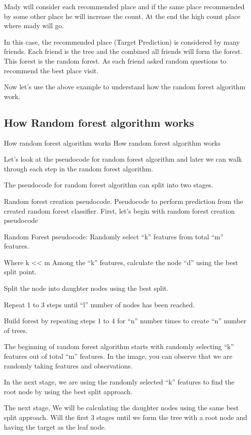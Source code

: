 \documentclass[a4paper,12pt]{article}
\begin{document}
Mady will consider each recommended place and if the same place recommended by some other place he will increase the count. At the end the high count place where mady will go.

In this case, the recommended place (Target Prediction) is considered by many friends. Each friend is the tree and the combined all friends will form the forest. This forest is the random forest. As each friend asked random questions to recommend the best place visit.

Now let’s use the above example to understand how the random forest algorithm work.

\subsection*{How Random forest algorithm works}
How random forest algorithm works
How random forest algorithm works

Let’s look at the pseudocode for random forest algorithm and later we can walk through each step in the random forest algorithm.

The pseudocode for random forest algorithm can split into two stages.

Random forest creation pseudocode.
Pseudocode to perform prediction from the created random forest classifier.
First, let’s begin with random forest creation pseudocode

Random Forest pseudocode:
Randomly select “k” features from total “m” features.

Where k << m
Among the “k” features, calculate the node “d” using the best split point.

Split the node into daughter nodes using the best split.

Repeat 1 to 3 steps until “l” number of nodes has been reached.

Build forest by repeating steps 1 to 4 for “n” number times to create “n” number of trees.

The beginning of random forest algorithm starts with randomly selecting “k” features out of total “m” features. In the image, you can observe that we are randomly taking features and observations.

In the next stage, we are using the randomly selected “k” features to find the root node by using the best split approach.

The next stage, We will be calculating the daughter nodes using the same best split approach. Will the first 3 stages until we form the tree with a root node and having the target as the leaf node.
\end{document}
